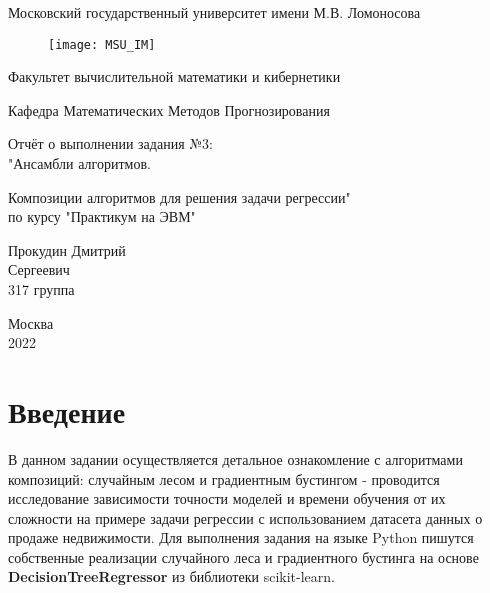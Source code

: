 \documentclass[12pt, a4paper]{article}
\begin{document}
\def\contentsname{Содержание}
\begin{titlepage}

\fontsize{15pt}{20pt}\selectfont
\begin{center}
\fontsize{15pt}{20pt}\selectfont
Московский государственный университет имени М.В. Ломоносова
\end{center}
\begin{figure}[H]
    	\centering
    \texttt{[image: MSU\_IM]}
\end{figure}

\begin{center}
\fontsize{15pt}{20pt}\selectfont
Факультет вычислительной математики и кибернетики

Кафедра Математических Методов Прогнозирования
\end{center}
\vspace{10em}

\begin{center}
\begin{bfseries}
\fontsize{20pt}{25pt}\selectfont
\linespread{2}
Отчёт о выполнении задания №3:\\"Ансамбли алгоритмов.

Композиции алгоритмов для решения задачи регрессии"\\
\fontsize{15pt}{20pt}\selectfont
по курсу "Практикум на ЭВМ"

\end{bfseries}
\end{center}
\vspace{5em}
\begin{flushright}
\fontsize{15pt}{20pt}\selectfont
Прокудин Дмитрий\\
Сергеевич\\
317 группа
\end{flushright}
\vspace{\fill}
\begin{center}
\fontsize{15pt}{20pt}\selectfont
Москва\\2022
\end{center}

\end{titlepage}

\newpage
\setcounter{page}{2}
\tableofcontents{}

\newpage
\section{Введение}
В данном задании осуществляется детальное ознакомление с алгоритмами композиций: случайным лесом и градиентным бустингом - проводится исследование зависимости точности моделей и времени обучения от их сложности на примере задачи регрессии с использованием датасета данных о продаже недвижимости. Для выполнения задания на языке Python пишутся собственные реализации случайного леса и градиентного бустинга на основе \colorbox{gray!20}{\textbf{DecisionTreeRegressor}} из библиотеки scikit-learn.
\end{document}
